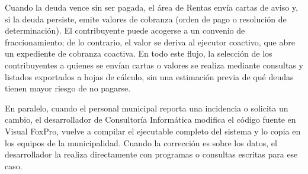 \documentclass[12pt,a4paper]{report}
\begin{document}
Cuando la deuda vence sin ser pagada, el área de Rentas envía cartas de aviso y, si la deuda persiste, emite valores de cobranza (orden de pago o resolución de determinación). El contribuyente puede acogerse a un convenio de fraccionamiento; de lo contrario, el valor se deriva al ejecutor coactivo, que abre un expediente de cobranza coactiva. En todo este flujo, la selección de los contribuyentes a quienes se envían cartas o valores se realiza mediante consultas y listados exportados a hojas de cálculo, sin una estimación previa de qué deudas tienen mayor riesgo de no pagarse.

En paralelo, cuando el personal municipal reporta una incidencia o solicita un cambio, el desarrollador de Consultoría Informática modifica el código fuente en Visual FoxPro, vuelve a compilar el ejecutable completo del sistema y lo copia en los equipos de la municipalidad. Cuando la corrección es sobre los datos, el desarrollador la realiza directamente con programas o consultas escritas para ese caso.
\end{document}
